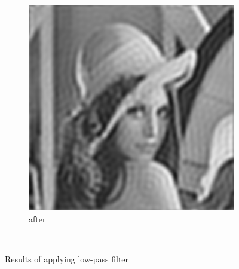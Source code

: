 \documentclass[12pt]{article}
\begin{document}
\begin{figure}[H]
\begin{subfigure}[t]{\subfiguresize}
        \includegraphics[width=\textwidth]{img/lena_lowpass.png}
        \caption{after}
    \end{subfigure}\\[1em]
    \caption{Results of applying low-pass filter}
\end{figure}   
\end{document}
